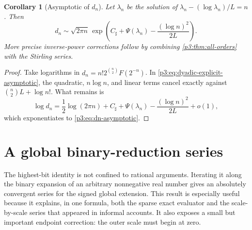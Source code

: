 \documentclass[11pt]{article}
\numberwithin{equation}{section}
\newtheorem{corollary}[theorem]{Corollary}
\theoremstyle{definition}
\theoremstyle{remark}
\begin{document}
\begin{corollary}[Asymptotic of $d_n$]\label{p3:cor:dn-asymptotic}
Let $\lambda_n$ be the solution of
$\lambda_n-(\log\lambda_n)/L=n$.  Then
\begin{equation}\label{p3:eq:dn-asymptotic}
 d_n\sim\sqrt{2\pi n}\,
 \exp\!\left(
 C_\sharp+\Psi(\lambda_n)-\frac{(\log n)^2}{2L}
 \right).
\end{equation}
More precise inverse-power corrections follow by combining
\cref{p3:thm:all-orders} with the Stirling series.
\end{corollary}

\begin{proof}
Take logarithms in
$d_n=n!2^{\binom n2}F(2^{-n})$.  In
\eqref{p3:eq:dyadic-explicit-asymptotic}, the quadratic, $n\log n$, and linear
terms cancel exactly against $\binom n2L+\log n!$.  What remains is
\[
 \log d_n=\frac12\log(2\pi n)+C_\sharp+\Psi(\lambda_n)
 -\frac{(\log n)^2}{2L}+o(1),
\]
which exponentiates to \eqref{p3:eq:dn-asymptotic}.
\end{proof}


\section{A global binary-reduction series}\label{p3:sec:binary-series}

The highest-bit identity is not confined to rational arguments.  Iterating it
along the binary expansion of an arbitrary nonnegative real number gives an
absolutely convergent series for the signed global extension.  This result is
especially useful because it explains, in one formula, both the sparse exact
evaluator and the scale-by-scale series that appeared in informal accounts.
It also exposes a small but important endpoint correction: the outer scale
must begin at zero.
\end{document}
